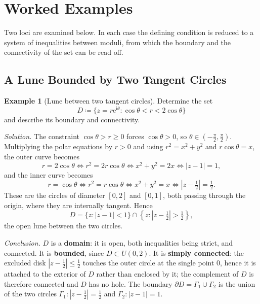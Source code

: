 \documentclass[11pt,a4paper]{article}
\theoremstyle{definition}
\newtheorem{example}{Example}
\theoremstyle{plain}
\begin{document}
\section{Worked Examples}

Two loci are examined below. In each case the defining condition is reduced to a system of inequalities between moduli, from which the boundary and the connectivity of the set can be read off.

\subsection{A Lune Bounded by Two Tangent Circles}

\begin{example}[Lune between two tangent circles]
Determine the set
\begin{equation}
D \coloneqq \{ z = r\mathrm{e}^{\mathrm{i}\theta} : \cos\theta < r < 2\cos\theta \}
\end{equation}
and describe its boundary and connectivity.
\end{example}

\noindent\textit{Solution.} The constraint $\cos\theta > r \ge 0$ forces $\cos\theta > 0$, so $\theta \in (-\frac{\pi}{2}, \frac{\pi}{2})$. Multiplying the polar equations by $r > 0$ and using $r^2 = x^2 + y^2$ and $r\cos\theta = x$, the outer curve becomes
\begin{equation}
r = 2\cos\theta \iff r^2 = 2r\cos\theta \iff x^2 + y^2 = 2x \iff |z - 1| = 1,
\end{equation}
and the inner curve becomes
\begin{equation}
r = \cos\theta \iff r^2 = r\cos\theta \iff x^2 + y^2 = x \iff \left|z - \tfrac{1}{2}\right| = \tfrac{1}{2}.
\end{equation}
These are the circles of diameter $[0,2]$ and $[0,1]$, both passing through the origin, where they are internally tangent. Hence
\begin{equation}
D = \{ z : |z - 1| < 1 \} \cap \left\{ z : \left|z - \tfrac{1}{2}\right| > \tfrac{1}{2} \right\},
\end{equation}
the open lune between the two circles.

\noindent\textit{Conclusion.} $D$ is a \textbf{domain}: it is open, both inequalities being strict, and connected. It is \textbf{bounded}, since $D \subset U(0,2)$. It is \textbf{simply connected}: the excluded disk $|z - \frac{1}{2}| \le \frac{1}{2}$ touches the outer circle at the single point $0$, hence it is attached to the exterior of $D$ rather than enclosed by it; the complement of $D$ is therefore connected and $D$ has no hole. The boundary $\partial D = \Gamma_1 \cup \Gamma_2$ is the union of the two circles $\Gamma_1 : |z - \frac{1}{2}| = \frac{1}{2}$ and $\Gamma_2 : |z - 1| = 1$.
\end{document}

